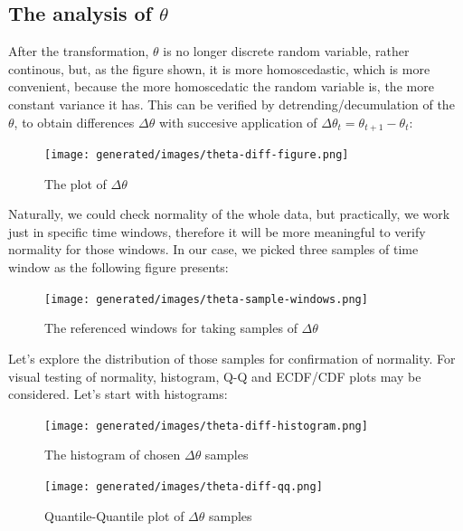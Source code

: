 \documentclass[
  digital, %
  oneside, %
  lof,     %
  lot,     %
]{fithesis4}
\begin{document}
\subsection{The analysis of \texorpdfstring{$\theta$}{Lg}}

After the transformation, $\theta$ is no 
longer discrete random variable, rather 
continous, but, as the figure shown, it 
is more homoscedastic, which is more 
convenient, because the more homoscedatic 
the random variable is, the more constant variance 
it has. 
This can be verified by detrending/decumulation 
of the $\theta$, to obtain differences 
$\Delta \theta$ with succesive application of 
$\Delta \theta_t = \theta_{t+1} - \theta_{t}$:

\begin{figure}[h]
  \begin{center}
    \texttt{[image: generated/images/theta-diff-figure.png]}
  \end{center}
  \caption{The plot of $\Delta \theta$}
  \label{fig:theta-diff}
\end{figure}

Naturally, we could check normality of the 
whole data, but practically, we work just in 
specific time windows, therefore it will be 
more meaningful to verify normality for those 
windows. In our case, we picked three samples 
of time window as the following figure presents:

\begin{figure}[h]
  \begin{center}
    \texttt{[image: generated/images/theta-sample-windows.png]}
  \end{center}
  \caption{The referenced windows for taking samples of $\Delta \theta$}
  \label{fig:theta-sample-windows}
\end{figure}

Let's explore the distribution of those samples 
for confirmation of normality. 
For visual testing of normality, histogram, 
Q-Q and ECDF/CDF plots may be considered. 
Let's start with histograms:

\begin{figure}[h]
  \begin{center}
    \texttt{[image: generated/images/theta-diff-histogram.png]}
  \end{center}
  \caption{The histogram of chosen $\Delta \theta$ samples}
  \label{fig:theta-diff-histogram}
\end{figure}

\begin{figure}[h]
  \begin{center}
    \texttt{[image: generated/images/theta-diff-qq.png]}
  \end{center}
  \caption{Quantile-Quantile plot of $\Delta \theta$ samples}
  \label{fig:theta-diff-qq}
\end{figure}
\end{document}
